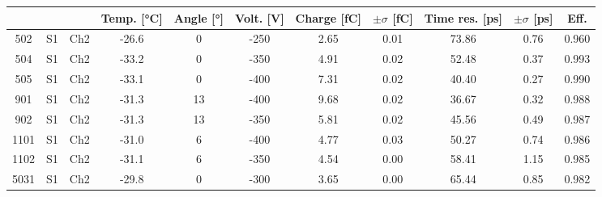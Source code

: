 \begin{tabular}{ccccccccccc}
\toprule
 &  &  & Temp. [°C] & Angle [°] & Volt. [V] & Charge [fC] & \(\pm\sigma\) [fC] & Time res. [ps] & \(\pm\sigma\) [ps] & Eff. \\
\midrule
502 & S1 & Ch2 & -26.6 & 0 & -250 & 2.65 & 0.01 & 73.86 & 0.76 & 0.960 \\
504 & S1 & Ch2 & -33.2 & 0 & -350 & 4.91 & 0.02 & 52.48 & 0.37 & 0.993 \\
505 & S1 & Ch2 & -33.1 & 0 & -400 & 7.31 & 0.02 & 40.40 & 0.27 & 0.990 \\
901 & S1 & Ch2 & -31.3 & 13 & -400 & 9.68 & 0.02 & 36.67 & 0.32 & 0.988 \\
902 & S1 & Ch2 & -31.3 & 13 & -350 & 5.81 & 0.02 & 45.56 & 0.49 & 0.987 \\
1101 & S1 & Ch2 & -31.0 & 6 & -400 & 4.77 & 0.03 & 50.27 & 0.74 & 0.986 \\
1102 & S1 & Ch2 & -31.1 & 6 & -350 & 4.54 & 0.00 & 58.41 & 1.15 & 0.985 \\
5031 & S1 & Ch2 & -29.8 & 0 & -300 & 3.65 & 0.00 & 65.44 & 0.85 & 0.982 \\
\bottomrule
\end{tabular}
